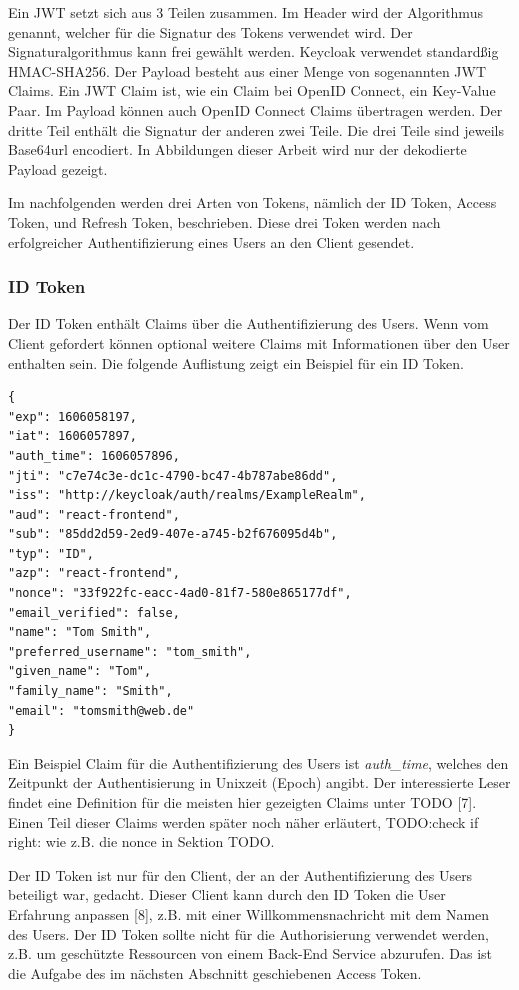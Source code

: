 Ein JWT setzt sich aus 3 Teilen zusammen. Im Header wird der Algorithmus genannt, welcher für die Signatur des Tokens verwendet wird. Der Signaturalgorithmus kann frei gewählt werden. Keycloak verwendet standardßig HMAC-SHA256. Der Payload besteht aus einer Menge von sogenannten JWT Claims. Ein JWT Claim ist, wie ein Claim bei OpenID Connect, ein Key-Value Paar. Im Payload können auch OpenID Connect Claims übertragen werden. Der dritte Teil enthält die Signatur der anderen zwei Teile. Die drei Teile sind jeweils Base64url encodiert. In Abbildungen dieser Arbeit wird nur der dekodierte Payload gezeigt.

Im nachfolgenden werden drei Arten von Tokens, nämlich der ID Token, Access Token, und Refresh Token, beschrieben. Diese drei Token werden nach erfolgreicher Authentifizierung eines Users an den Client gesendet.

\subsubsection{ID Token}

Der ID Token enthält Claims über die Authentifizierung des Users. Wenn vom Client gefordert können optional weitere Claims mit Informationen über den User enthalten sein. Die folgende Auflistung zeigt ein Beispiel für ein ID Token.

\begin{lstlisting}[caption=Beispiel ID Token, captionpos=b]
{
"exp": 1606058197,
"iat": 1606057897,
"auth_time": 1606057896,
"jti": "c7e74c3e-dc1c-4790-bc47-4b787abe86dd",
"iss": "http://keycloak/auth/realms/ExampleRealm",
"aud": "react-frontend",
"sub": "85dd2d59-2ed9-407e-a745-b2f676095d4b",
"typ": "ID",
"azp": "react-frontend",
"nonce": "33f922fc-eacc-4ad0-81f7-580e865177df",
"email_verified": false,
"name": "Tom Smith",
"preferred_username": "tom_smith",
"given_name": "Tom",
"family_name": "Smith",
"email": "tomsmith@web.de"
}
\end{lstlisting}

Ein Beispiel Claim für die Authentifizierung des Users ist \emph{auth\_time}, welches den Zeitpunkt der Authentisierung in Unixzeit (Epoch) angibt. Der interessierte Leser findet eine Definition für die meisten hier gezeigten Claims unter TODO [7]. Einen Teil dieser Claims werden später noch näher erläutert, TODO:check if right: wie z.B. die nonce in Sektion TODO.

Der ID Token ist nur für den Client, der an der Authentifizierung des Users beteiligt war, gedacht. Dieser Client kann durch den ID Token die User Erfahrung anpassen [8], z.B. mit einer Willkommensnachricht mit dem Namen des Users. Der ID Token sollte nicht für die Authorisierung verwendet werden, z.B. um geschützte Ressourcen von einem Back-End Service abzurufen. Das ist die Aufgabe des im nächsten Abschnitt geschiebenen Access Token.

